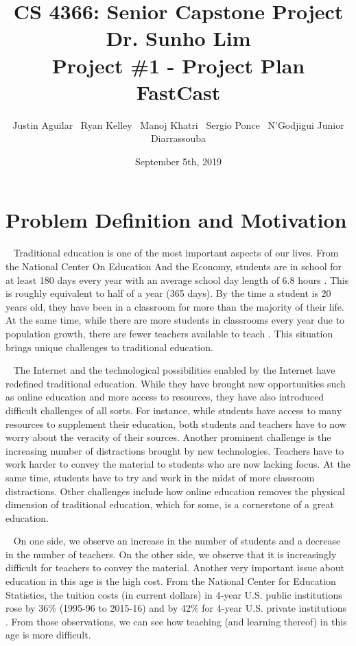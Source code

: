 \documentclass[10pt, a4paper]{article}
\title{\large CS 4366: Senior Capstone Project \\ Dr. Sunho Lim \\ Project \#1 - Project Plan \\ FastCast}
\author{Justin Aguilar \ Ryan Kelley \ Manoj Khatri \ Sergio Ponce \ N'Godjigui Junior Diarrassouba}
\date{September 5th, 2019}
\begin{document}
\maketitle

\section{Problem Definition and Motivation}
\par ~ Traditional education is one of the most important aspects of our lives. From the National Center On Education And the Economy, students are in school for at least 180 days every year with an average school day length of 6.8 hours \cite{one}. This is roughly equivalent to half of a year (365 days). By the time a student is 20 years old, they have been in a classroom for more than the majority of their life. At the same time, while there are more students in classrooms every year due to population growth, there are fewer teachers available to teach \cite{two}. This situation brings unique challenges to traditional education.

\par ~ The Internet and the technological possibilities enabled by the Internet have redefined traditional education. While they have brought new opportunities such as online education and more access to resources, they have also introduced difficult challenges of all sorts. For instance, while students have access to many resources to supplement their education, both students and teachers have to now worry about the veracity of their sources. Another prominent challenge is the increasing number of distractions brought by new technologies. Teachers have to work harder to convey the material to students who are now lacking focus. At the same time, students have to try and work in the midst of more classroom distractions. Other  challenges  include  how  online  education  removes  the  physical  dimension  of traditional education, which for some, is a cornerstone of a great education.

\par ~ On one side, we observe an increase in the number of students and a decrease in the number of teachers. On the other side, we observe that it is increasingly difficult for teachers to convey the material. Another very important issue about education in this age is the high cost. From the National Center for Education Statistics, the tuition costs (in current dollars) in 4-year U.S. public institutions rose by 36\% (1995-96 to 2015-16) and by 42\% for 4-year U.S. private institutions \cite{three}. From those observations, we can see how teaching (and learning thereof) in this age is more difficult. 
\end{document}
